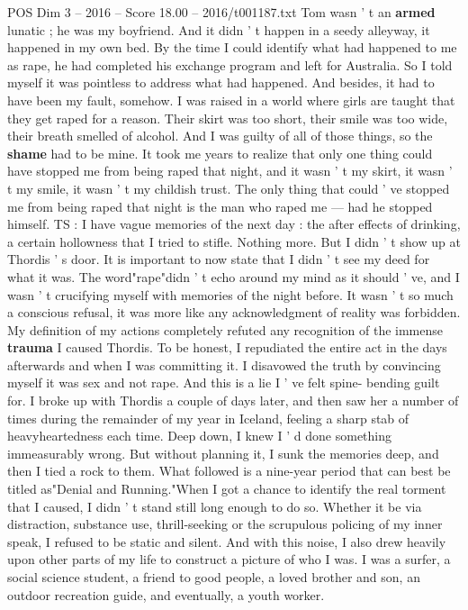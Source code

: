 \begin{textsample}{POS Dim 3 – 2016 – Score 18.00 – 2016/t001187.txt}
Tom wasn ' t an \textbf{armed} lunatic ; he was my boyfriend.
And it didn ' t happen in a seedy alleyway, it happened in my own bed.
By the time I could identify what had happened to me as rape, he had completed his exchange program and left for Australia.
So I told myself it was pointless to address what had happened.
And besides, it had to have been my fault, somehow.
I was raised in a world where girls are taught that they get raped for a reason.
Their skirt was too short, their smile was too wide, their breath smelled of alcohol.
And I was guilty of all of those things, so the \textbf{shame} had to be mine.
It took me years to realize that only one thing could have stopped me from being raped that night, and it wasn ' t my skirt, it wasn ' t my smile, it wasn ' t my childish trust.
The only thing that could ' ve stopped me from being raped that night is the man who raped me — had he stopped himself.
TS : I have vague memories of the next day : the after effects of drinking, a certain hollowness that I tried to stifle.
Nothing more.
But I didn ' t show up at Thordis ' s door.
It is important to now state that I didn ' t see my deed for what it was.
The word"rape"didn ' t echo around my mind as it should ' ve, and I wasn ' t crucifying myself with memories of the night before.
It wasn ' t so much a conscious refusal, it was more like any acknowledgment of reality was forbidden.
My definition of my actions completely refuted any recognition of the immense \textbf{trauma} I caused Thordis.
To be honest, I repudiated the entire act in the days afterwards and when I was committing it.
I disavowed the truth by convincing myself it was sex and not rape.
And this is a lie I ' ve felt spine- bending guilt for.
I broke up with Thordis a couple of days later, and then saw her a number of times during the remainder of my year in Iceland, feeling a sharp stab of heavyheartedness each time.
Deep down, I knew I ' d done something immeasurably wrong.
But without planning it, I sunk the memories deep, and then I tied a rock to them.
What followed is a nine-year period that can best be titled as"Denial and Running."When I got a chance to identify the real torment that I caused, I didn ' t stand still long enough to do so.
Whether it be via distraction, substance use, thrill-seeking or the scrupulous policing of my inner speak, I refused to be static and silent.
And with this noise, I also drew heavily upon other parts of my life to construct a picture of who I was.
I was a surfer, a social science student, a friend to good people, a loved brother and son, an outdoor recreation guide, and eventually, a youth worker.

\end{textsample}

